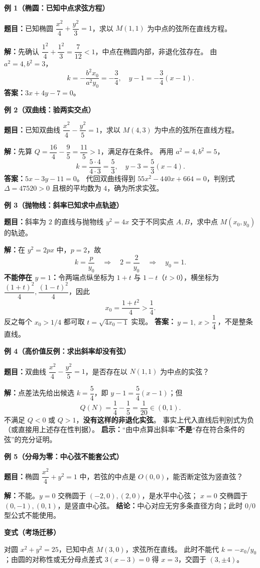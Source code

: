 \clearpage
\begin{examplebox}
\textbf{\textcolor{CExample}{例 1（椭圆：已知中点求弦方程）}}

\textbf{题目：}已知椭圆 $\dfrac{x^2}{4}+\dfrac{y^2}{3}=1$，求以 $M(1,1)$ 为中点的弦所在直线方程。

\textbf{解：}先确认 $\dfrac{1^2}{4}+\dfrac{1^2}{3}=\dfrac7{12}<1$，中点在椭圆内部，非退化弦存在。
由 $a^2=4,b^2=3$，
\[
k=-\frac{b^2x_0}{a^2y_0}=-\frac34,
\quad y-1=-\frac34(x-1).
\]
\textbf{答案：}$\boxed{3x+4y-7=0}$。

\medskip
\textbf{\textcolor{CExample}{例 2（双曲线：验两实交点）}}

\textbf{题目：}已知双曲线 $\dfrac{x^2}{4}-\dfrac{y^2}{5}=1$，求以 $M(4,3)$ 为中点的弦所在直线方程。

\textbf{解：}先算 $Q=\dfrac{16}{4}-\dfrac95=\dfrac{11}{5}>1$，满足存在条件。
再用 $a^2=4,b^2=5$，
\[
k=\frac{5\cdot4}{4\cdot3}=\frac53,
\quad y-3=\frac53(x-4).
\]
\textbf{答案：}$\boxed{5x-3y-11=0}$。
代回双曲线得到 $55x^2-440x+664=0$，判别式
$\Delta=47520>0$ 且根的平均数为 $4$，确为所求实弦。

\tcbbreak
\textbf{\textcolor{CExample}{例 3（抛物线：斜率已知求中点轨迹）}}
\begin{center}\end{center}

\textbf{题目：}斜率为 $2$ 的直线与抛物线 $y^2=4x$ 交于不同实点 $A,B$，求中点 $M(x_0,y_0)$ 的轨迹。

\textbf{解：}在 $y^2=2px$ 中，$p=2$，故
\[
k=\frac{p}{y_0}\quad\Longrightarrow\quad
2=\frac2{y_0}\quad\Longrightarrow\quad y_0=1.
\]
\textbf{不能停在 $y=1$：}令两端点纵坐标为 $1+t$ 与 $1-t$（$t>0$），横坐标为
$\dfrac{(1+t)^2}{4},\dfrac{(1-t)^2}{4}$，因此
\[
x_0=\frac{1+t^2}{4}>\frac14.
\]
反之每个 $x_0>1/4$ 都可取 $t=\sqrt{4x_0-1}$ 实现。
\textbf{答案：}$\boxed{\ y=1,\ x>\dfrac14\ }$，不是整条直线。

\tcbbreak
\textbf{\textcolor{CExample}{例 4（高价值反例：求出斜率却没有弦）}}

\textbf{题目：}双曲线 $\dfrac{x^2}{4}-\dfrac{y^2}{5}=1$，是否存在以 $N(1,1)$ 为中点的实弦？

\textbf{解：}点差法先给出候选 $k=\dfrac{5}{4}$，即
$y-1=\dfrac54(x-1)$；但
\[
Q(N)=\frac14-\frac15=\frac1{20}\in(0,1).
\]
不满足 $Q<0$ 或 $Q>1$，\textbf{没有这样的非退化实弦}。
事实上代入直线后判别式为负（或直接用上述存在性判据）。
\textbf{启示：}“由中点算出斜率”\textbf{不是}“存在符合条件的弦”的充分证明。

\medskip
\textbf{\textcolor{CExample}{例 5（分母为零：中心弦不能套公式）}}

\textbf{题目：}椭圆 $\dfrac{x^2}{4}+y^2=1$ 中，若弦的中点是 $O(0,0)$，能否断定弦为竖直弦？

\textbf{解：}不能。$y=0$ 交椭圆于 $(-2,0),(2,0)$，是水平中心弦；
$x=0$ 交椭圆于 $(0,-1),(0,1)$，是竖直中心弦。
\textbf{结论：}中心对应无穷多条直径方向；此时 $0/0$ 型公式不能使用。

\medskip
\textbf{\textcolor{CExample}{变式（考场迁移）}}

对圆 $x^2+y^2=25$，已知中点 $M(3,0)$，求弦所在直线。
此时不能代 $k=-x_0/y_0$；由圆的对称性或无分母点差式
$3(x-3)=0$ 得 $\boxed{x=3}$，交圆于 $(3,\pm4)$。
\end{examplebox}
